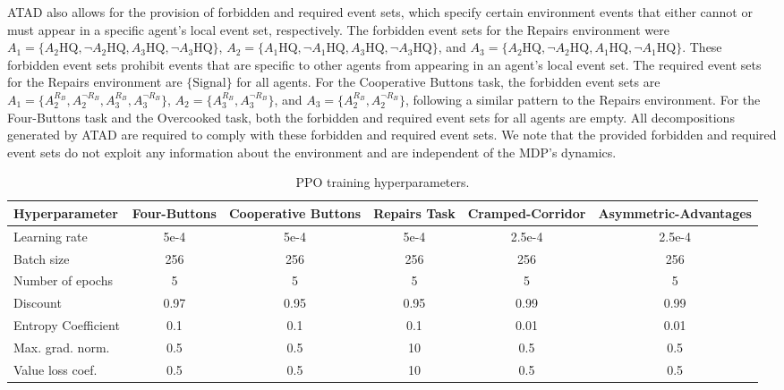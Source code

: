  ATAD also allows for the provision of forbidden and required event sets, which specify certain environment events that either cannot or must appear in a specific agent's local event set, respectively. The forbidden event sets for the Repairs environment were $A_1 = \{A_2\text{HQ}, \neg A_2\text{HQ},A_3\text{HQ}, \neg A_3\text{HQ}\}$, $A_2 = \{A_1\text{HQ}, \neg A_1\text{HQ},A_3\text{HQ}, \neg A_3\text{HQ}\}$, and $A_3 = \{A_2\text{HQ}, \neg A_2\text{HQ}, A_1\text{HQ}, \neg A_1\text{HQ}\}$. These forbidden event sets prohibit events that are specific to other agents from appearing in an agent's local event set. The required event sets for the Repairs environment are $\{ \text{Signal}\}$ for all agents. For the Cooperative Buttons task, the forbidden event sets are $A_1 = \{A_{2}^{R_B}, A_{2}^{\neg R_B}, A_{3}^{R_B}, A_{3}^{\neg R_B}\}$, $A_2 = \{A_{3}^{R_B}, A_{3}^{\neg R_B}\}$, and $A_3 = \{A_{2}^{R_B}, A_{2}^{\neg R_B}\}$, following a similar pattern to the Repairs environment. For the Four-Buttons task and the Overcooked task, both the forbidden and required event sets for all agents are empty. All decompositions generated by ATAD are required to comply with these forbidden and required event sets. We note that the provided forbidden and required event sets do not exploit any information about the environment and are independent of the MDP's dynamics.

 \begin{table*}[ht]
    \centering
    \begin{tabular}{lccccc}
        \hline
        \textbf{Hyperparameter} & \textbf{Four-Buttons} &  \textbf{Cooperative Buttons} & \textbf{Repairs Task} & \textbf{Cramped-Corridor} & \textbf{Asymmetric-Advantages} \\
        \hline
        Learning rate          & 5e-4   &  5e-4     & 5e-4   &2.5e-4  &2.5e-4\\
        Batch size             & 256      &  256        & 256    &256  & 256\\
        Number of epochs       & 5        &  5          & 5  & 5 & 5\\
        Discount               & 0.97      &  0.95       & 0.95  & 0.99 & 0.99\\
        Entropy Coefficient    & 0.1     &  0.1       & 0.1  & 0.01 & 0.01\\
        Max. grad. norm.       & 0.5      & 0.5         & 10  & 0.5 & 0.5\\
        Value loss coef.       & 0.5      & 0.5         & 10  & 0.5 & 0.5\\
        \hline
    \end{tabular}
    \caption{PPO training hyperparameters.}
    \label{tab:ppo_hyperparameters}
\end{table*}

